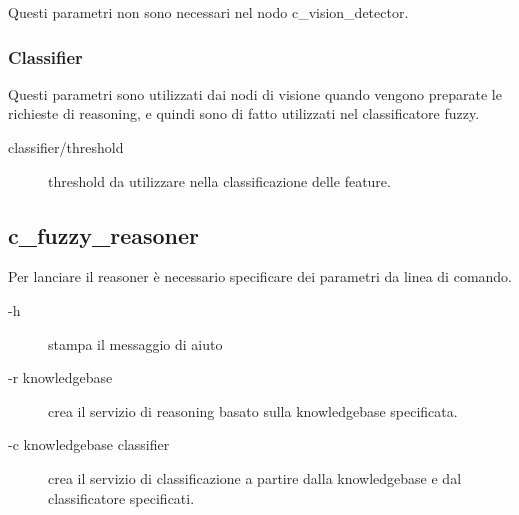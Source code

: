 Questi parametri non sono necessari nel nodo c\_vision\_detector.

\subsubsection{Classifier}

Questi parametri sono utilizzati dai nodi di visione quando vengono preparate le richieste di reasoning, e quindi sono di fatto utilizzati nel classificatore fuzzy.

\begin{description}
 \item [classifier/threshold] threshold da utilizzare nella classificazione delle feature.
\end{description}

\subsection{c\_fuzzy\_reasoner}

Per lanciare il reasoner è necessario specificare dei parametri da linea di comando.

\begin{description}
 \item [-h] stampa il messaggio di aiuto 
 \item [-r knowledgebase] crea il servizio di reasoning basato sulla knowledgebase specificata.  
 \item [-c knowledgebase classifier] crea il servizio di classificazione a partire dalla knowledgebase e dal classificatore specificati. 

\end{description}

